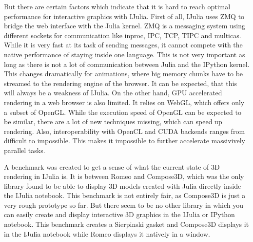 But there are certain factors which indicate that it is hard to reach optimal performance for interactive graphics with IJulia.
First of all, IJulia uses ZMQ to bridge the web interface with the Julia kernel.
ZMQ\cite{ZMQ} is a messaging system using different sockets for communication like inproc, IPC, TCP, TIPC and multicas.
While it is very fast at its task of sending messages, it cannot compete with the native performance of staying inside one language.
This is not very important as long as there is not a lot of communication between Julia and the IPython kernel. This changes dramatically for animations, where big memory chunks have to be streamed to the rendering engine of the browser. It can be expected, that this will always be a weakness of IJulia.
On the other hand, \ac{GPU} accelerated rendering in a web browser is also limited.
It relies on \ac{WebGL}, which offers only a subset of OpenGL. While the execution speed of OpenGL can be expected to be similar, there are a lot of new techniques missing, which can speed up rendering. Also, interoperability with \ac{OpenCL} and \ac{CUDA} backends ranges from difficult to impossible. 
This makes it impossible to further accelerate massivively parallel tasks.

A benchmark was created to get a sense of what the current state of 3D rendering in IJulia is.
It is between Romeo and Compose3D\cite{Compose3D}, which was the only library found to be able to display 3D models created with Julia directly inside the IJulia notebook.
This benchmark is not entirely fair, as Compose3D is just a very rough prototype so far. 
But there seem to be no other library in which you can easily create and display interactive 3D graphics in the IJulia or IPython notebook. 
This benchmark creates a Sierpinski gasket and Compose3D displays it in the IJulia notebook while Romeo displays it natively in a window.

